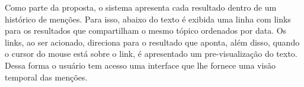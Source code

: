 Como parte da proposta, o sistema apresenta cada resultado dentro de um histórico de menções. Para isso, abaixo do texto é exibida uma linha com links para os resultados que compartilham o mesmo tópico ordenados por data. Os links, ao ser acionado, direciona para o resultado que aponta, além disso, quando o cursor do mouse está sobre o link, é apresentado um pre-visualização do texto. Dessa forma o usuário tem acesso uma interface que lhe fornece uma visão temporal das menções.






